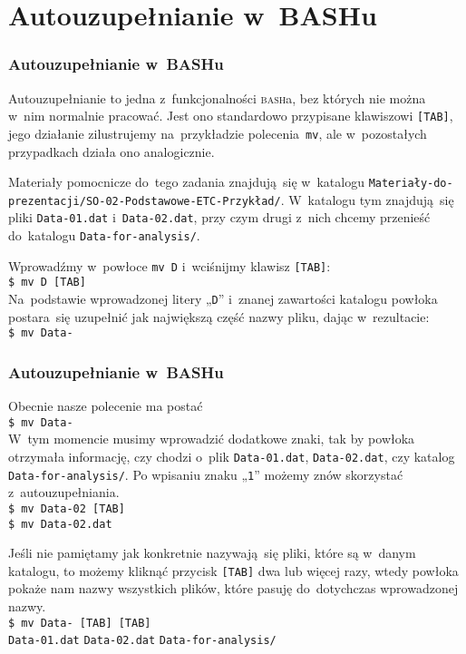 \documentclass[10pt,t]{beamer}
\begin{document}
\section{Autouzupełnianie w~BASHu}


\begin{frame}
  \frametitle{Autouzupełnianie w~BASHu}


  Autouzupełnianie to jedna z~funkcjonalności \textsc{bash}a, bez których
  nie można w~nim normalnie pracować. Jest ono standardowo przypisane
  klawiszowi \texttt{[TAB]}, jego działanie zilustrujemy na~przykładzie
  polecenia~\texttt{mv}, ale w~pozostałych przypadkach działa ono
  analogicznie.

  Materiały pomocnicze do~tego zadania znajdują~się w~katalogu
  \texttt{Materiały-do-prezentacji/SO-02-Podstawowe-ETC-Przykład/}.
  W~katalogu tym znajdują~się pliki \texttt{Data-01.dat}
  i~\texttt{Data-02.dat}, przy czym drugi z~nich chcemy przenieść
  do~katalogu \texttt{Data-for-analysis/}.

  Wprowadźmy w~powłoce \texttt{mv D} i~wciśnijmy klawisz \texttt{[TAB]}: \\
  \texttt{\$ mv D [TAB]} \\
  Na~podstawie wprowadzonej litery „\texttt{D}” i~znanej zawartości
  katalogu powłoka postara~się uzupełnić jak największą część nazwy pliku,
  dając w~rezultacie: \\
  \texttt{\$ mv Data-}

\end{frame}





\begin{frame}
  \frametitle{Autouzupełnianie w~BASHu}


  Obecnie nasze polecenie ma postać \\
  \texttt{\$ mv Data-} \\
  W~tym momencie musimy wprowadzić dodatkowe znaki, tak by powłoka otrzymała
  informację, czy chodzi o~plik \texttt{Data-01.dat},
  \texttt{Data-02.dat}, czy katalog \texttt{Data-for-analysis/}. Po wpisaniu
  znaku „\texttt{1}” możemy znów skorzystać z~autouzupełniania. \\
  \texttt{\$ mv Data-02 [TAB]} \\
  \texttt{\$ mv Data-02.dat}

  Jeśli nie pamiętamy jak konkretnie nazywają~się pliki, które są w~danym
  katalogu, to możemy kliknąć przycisk \texttt{[TAB]} dwa lub więcej razy,
  wtedy powłoka pokaże nam nazwy wszystkich plików, które pasuję
  do~dotychczas wprowadzonej nazwy. \\
  \texttt{\$ mv Data- [TAB] \hspace{-1em} [TAB]} \\
  \texttt{Data-01.dat} \quad \texttt{Data-02.dat} \quad \texttt{Data-for-analysis/}

\end{frame}
\end{document}
